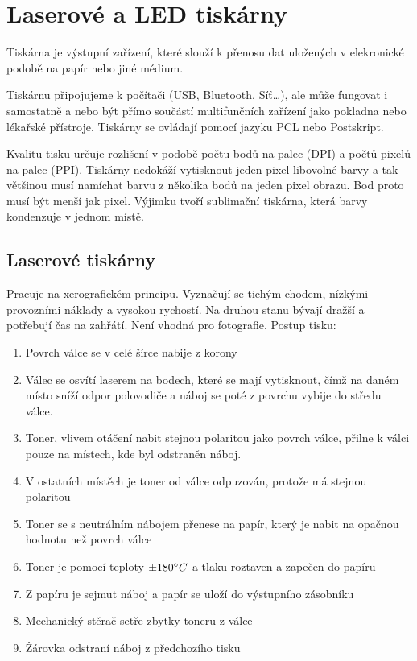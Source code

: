 \section{Laserové a LED tiskárny}
Tiskárna je výstupní zařízení, které slouží k přenosu dat uložených v elekronické podobě na papír nebo jiné médium.

Tiskárnu připojujeme k počítači (USB, Bluetooth, Síť\dots), ale může fungovat i samostatně a nebo být přímo součástí multifunčních zařízení jako pokladna nebo lékařské přístroje.
Tiskárny se ovládají pomocí jazyku PCL nebo Postskript.

Kvalitu tisku určuje rozlišení v podobě počtu bodů na palec (DPI) a počtů pixelů na palec (PPI).
Tiskárny nedokáží vytisknout jeden pixel libovolné barvy a tak většinou musí namíchat barvu z několika bodů na jeden pixel obrazu.
Bod proto musí být menší jak pixel.
Výjimku tvoří sublimační tiskárna, která barvy kondenzuje v jednom místě.
\subsection{Laserové tiskárny}
Pracuje na xerografickém principu.
Vyznačují se tichým chodem, nízkými provozními náklady a vysokou rychostí.
Na druhou stanu bývají dražší a potřebují čas na zahřátí.
Není vhodná pro fotografie.
Postup tisku:
\begin{enumerate}
  \item Povrch válce se v celé šírce nabije z korony
  \item Válec se osvítí laserem na bodech, které se mají vytisknout, čímž na daném místo sníží odpor polovodiče a náboj se poté z povrchu vybije do středu válce.
  \item Toner, vlivem otáčení nabit stejnou polaritou jako povrch válce, přilne k válci pouze na místech, kde byl odstraněn náboj.
  \item V ostatních místěch je toner od válce odpuzován, protože má stejnou polaritou
  \item Toner se s neutrálním nábojem přenese na papír, který je nabit na opačnou hodnotu než povrch válce
  \item Toner je pomocí teploty $\pm 180\degree C$ a tlaku roztaven a zapečen do papíru
  \item Z papíru je sejmut náboj a papír se uloží do výstupního zásobníku
  \item Mechanický stěrač setře zbytky toneru z válce
  \item Žárovka odstraní náboj z předchozího tisku
\end{enumerate}

